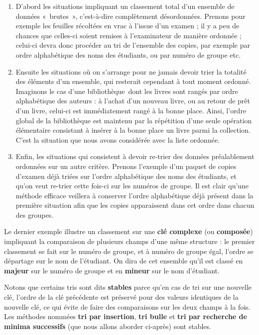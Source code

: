 	\liststyleWWviiiNumi
	\begin{enumerate}
		\item 
			D’abord les situations impliquant un classement total d’un ensemble de
			données «~brutes~», c’est-à-dire complètement désordonnées. Prenons
			pour exemple les feuilles récoltées en vrac à l’issue d’un examen ; il
			y a peu de chances que celles-ci soient remises à l’examinateur de
			manière ordonnée ; celui-ci devra donc procéder au tri de l’ensemble
			des copies, par exemple par ordre alphabétique des noms des étudiants,
			ou par numéro de groupe etc.
		\item 
			Ensuite les situations où on s’arrange pour ne jamais devoir trier la
			totalité des éléments d’un ensemble, qui resterait cependant à tout
			moment ordonné. Imaginons le cas d’une bibliothèque~dont les livres
			sont rangés par ordre alphabétique des auteurs : à l’achat d’un nouveau
			livre, ou au retour de prêt d’un livre, celui-ci est immédiatement
			rangé à la bonne place. Ainsi, l’ordre global de la bibliothèque est
			maintenu par la répétition d’une seule opération élémentaire consistant
			à insérer à la bonne place un livre parmi la collection. C’est la
			situation que nous avons considérée avec la liste ordonnée.
		\item 
			Enfin, les situations qui consistent à devoir re-trier des données
			préalablement ordonnées sur un autre critère. Prenons l’exemple d’un
			paquet de copies d’examen déjà triées sur l’ordre alphabétique des noms
			des étudiants, et qu’on veut re-trier cette fois-ci sur les numéros de
			groupe. Il est clair qu’une méthode efficace veillera à conserver
			l’ordre alphabétique déjà présent dans la première situation afin que
			les copies apparaissent dans cet ordre dans chacun des groupes.
	\end{enumerate}
	
	Le dernier exemple illustre un classement sur une \textbf{clé complexe}
	(ou \textbf{composée}) impliquant la comparaison de plusieurs champs
	d’une même structure : le premier classement se fait sur le numéro de
	groupe, et à numéro de groupe égal, l’ordre se départage sur le nom de
	l’étudiant. On dira de cet ensemble qu’il est classé en \textbf{majeur}
	sur le numéro de groupe et en \textbf{mineur} sur le nom d’étudiant.

	Notons que certains tris sont dits \textbf{stables} parce
	qu'en cas de tri sur une nouvelle clé, l’ordre de la
	clé précédente est préservé pour des valeurs identiques de la nouvelle
	clé, ce qui évite de faire des comparaisons sur les deux champs à la
	fois. Les méthodes nommées \textbf{tri par insertion}, \textbf{tri
	bulle} et \textbf{tri par recherche de minima successifs }(que nous
	allons aborder ci-après) sont stables.

